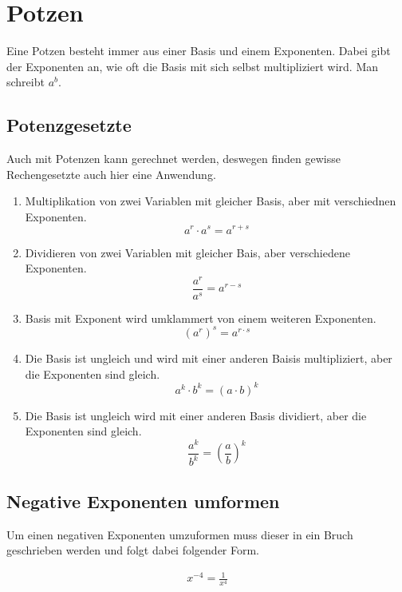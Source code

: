 \section{Potzen}\label{sec:Potenzen}
Eine Potzen besteht immer aus einer Basis und einem Exponenten. Dabei gibt der Exponenten an, wie oft die Basis mit sich selbst multipliziert wird. Man schreibt $a^b$. 
\subsection{Potenzgesetzte}\label{sec:Potenzen/Potenzgesetze}
 Auch mit Potenzen kann gerechnet werden, deswegen finden gewisse Rechengesetzte auch hier eine Anwendung.
\begin{enumerate}
	\item Multiplikation von zwei Variablen mit gleicher Basis, aber mit verschiednen Exponenten. \[a^r\cdot a^s=a^{r+s}\]
	\item Dividieren von zwei Variablen mit gleicher Bais, aber verschiedene Exponenten. \[\frac{a^r}{a^s}=a^{r-s}\]
	\item Basis mit Exponent wird umklammert von einem weiteren Exponenten. \[(a^r)^s=a^{r\cdot s}\]
	\item Die Basis ist ungleich und wird mit einer anderen Baisis multipliziert, aber die Exponenten sind gleich.\[a^k \cdot b^k =(a\cdot b)^k\]
	\item Die Basis ist ungleich wird mit einer anderen Basis dividiert, aber die Exponenten sind gleich. \[\frac{a^k}{b^k}=\left(\frac{a}{b}\right)^k\]
\end{enumerate}
\subsection{Negative Exponenten umformen}\label{sec:Potenzen/Negative Exponenten umformen}
Um einen negativen Exponenten umzuformen muss dieser in ein Bruch geschrieben werden und folgt dabei folgender Form. 

\begin{beispiel}
\begin{align*}
	x^{-4}=\frac{1}{x^4}
\end{align*}
\end{beispiel}
